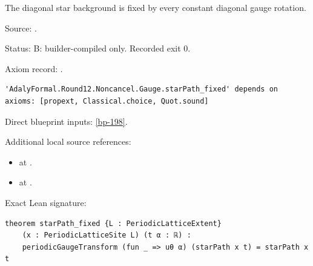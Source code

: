 \begin{theorem}[bp-200]
\label{bp-200}
\leanok
The diagonal star background is fixed by every constant diagonal gauge rotation.

\par Source: \texttt{}.
\par Status: B: builder-compiled only. Recorded exit 0.
\par Axiom record: \texttt{}.
\begin{verbatim}
'AdalyFormal.Round12.Noncancel.Gauge.starPath_fixed' depends on axioms: [propext, Classical.choice, Quot.sound]
\end{verbatim}
\par Direct blueprint inputs: \ref{bp-198}.
\par Additional local source references:
\begin{itemize}
\item \texttt{} at \texttt{}.
\item \texttt{} at \texttt{}.
\end{itemize}
\par Exact Lean signature:
\begin{verbatim}
theorem starPath_fixed {L : PeriodicLatticeExtent}
    (x : PeriodicLatticeSite L) (t α : ℝ) :
    periodicGaugeTransform (fun _ => uθ α) (starPath x t) = starPath x t
\end{verbatim}
\end{theorem}

